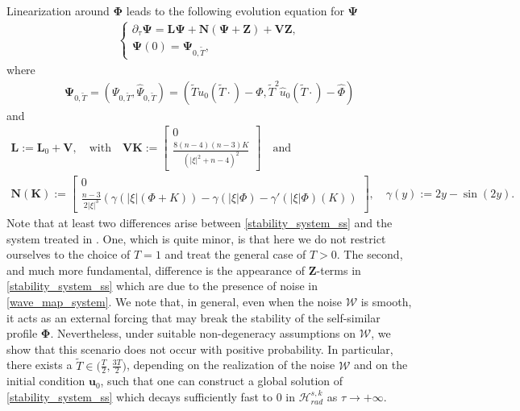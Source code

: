 \documentclass[12pt,reqno]{amsart}
\theoremstyle{plain}
\theoremstyle{remark}
\theoremstyle{plain}
\theoremstyle{definition}
\numberwithin{equation}{section}
\numberwithin{equation}{section}
\newcommand{\HH}{\mathcal{H}}
\begin{document}
Linearization around $\mathbf{\Phi}$ leads to the following evolution equation for $\mathbf{\Psi}$
	\begin{align}\label{stability_system_ss}
		\begin{cases}
			\partial_\tau \mathbf{\Psi}=\mathbf{L} \mathbf{\Psi}+\mathbf{N}(\mathbf{\Psi}+\mathbf{Z})+\mathbf{V}\mathbf{Z},\\
			\mathbf{\Psi}(0)=\mathbf{\Psi}_{0,\tilde{T}},
		\end{cases}
	\end{align}
	where 
	\begin{align}\label{initial_conditions_self_sim_perturb}
		\mathbf{\Psi}_{0,\tilde{T}}=({\Psi}_{0,\tilde{T}}, \hat{\Psi}_{0,\tilde{T}})=\left(\tilde{T}u_0(\tilde{T}\cdot)-\Phi,\tilde{T}^2\hat{u}_0(\tilde{T}\cdot)-\hat{\Phi}\right)
	\end{align}
	and
	\begin{gather}
		\mathbf{L}:=\mathbf{L}_0+\mathbf{V},\quad \text{with} \quad \mathbf{V}\mathbf{K}:=
		\begin{bmatrix}\label{linear_perturbed_operators_SS} 0 \\
			\frac{8(n-4)(n-3)K}{(\lvert\xi\rvert^2+n-4)^2}\end{bmatrix}
		 \quad \text{and} \\
		\mathbf{N}(\mathbf{K}):=
		\begin{bmatrix}
			0\\
			\frac{n-3}{2\lvert \xi\rvert^3}\left(\gamma(\lvert \xi\rvert(\Phi+K))-\gamma(\lvert \xi\rvert \Phi)-\gamma'(\lvert \xi\rvert \Phi)(K)\right)
		\end{bmatrix},\quad \gamma(y):=2y-\sin(2y)\label{nonlinear_perturbed_operators_SS}.
	\end{gather}
	Note that at least two differences arise between \eqref{stability_system_ss} and the system treated in \cite{glogic2025globally}. One, which is quite minor, is that here we do not restrict ourselves to the choice of $T=1$ and treat the general case of $T>0$. The second, and much more fundamental, difference is the appearance of $\mathbf{Z}$-terms in \eqref{stability_system_ss} which are due to the presence of noise in \eqref{wave_map_system}. We note that, in general, even when the noise $\mathcal{W}$ is smooth, it acts as an external forcing that may break the stability of the self-similar profile $\mathbf{\Phi}$. Nevertheless, under suitable non-degeneracy assumptions on $\mathcal{W}$, we show that this scenario does not occur with positive probability. In particular, there exists a $\tilde{T}\in \bigl(\tfrac{T}{2},\tfrac{3T}{2}\bigr)$, depending on the realization of the noise $\mathcal{W}$ and on the initial condition $\mathbf{u}_0$, such that one can construct a global solution of \eqref{stability_system_ss} which decays sufficiently fast to $0$ in $\HH_{rad}^{s,k}$ as $\tau \to +\infty$.
	
\end{document}
